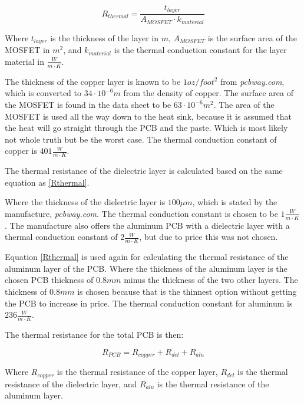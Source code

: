     \begin{equation}
        R_{thermal} = \frac{t_{layer}}{A_{MOSFET} \cdot k_{material}} 
        \label{Rthermal}
    \end{equation}
    
Where $t_{layer}$ is the thickness of the layer in $m$, $A_{MOSFET}$ is the surface area of the MOSFET in $m^2$, and $k_{material}$ is the thermal conduction constant for the layer material in $\frac{W}{m \cdot K}$.

The thickness of the copper layer is known to be $1 oz/foot^2$ from \textit{pcbway.com}, which is converted to $34 \cdot 10^{-6} m$ from the density of copper. The surface area of the MOSFET is found in the data sheet to be $63 \cdot 10^{-6} m^2$.\cite{mosfet} The area of the MOSFET is used all the way down to the heat sink, because it is assumed that the heat will go straight through the PCB and the paste. 
Which is most likely not whole truth but be the worst case.
The thermal conduction constant of copper is $401 \frac{W}{m \cdot K}$.\cite{toolbox}

The thermal resistance of the dielectric layer is calculated based on the same equation as \ref{Rthermal}.

Where the thickness of the dielectric layer is $100 \mu m$, which is stated by the manufacture, \textit{pcbway.com}. The thermal conduction constant is chosen to be $1 \frac{W}{m \cdot K}$. The manufacture also offers the aluminum PCB with a dielectric layer with a thermal conduction constant of $2 \frac{W}{m \cdot K}$, but due to price this was not chosen.

Equation \ref{Rthermal} is used again for calculating the thermal resistance of the aluminum layer of the PCB.
Where the thickness of the aluminum layer is the chosen PCB thickness of $0.8 mm$ minus the thickness of the two other layers. The thickness of $0.8 mm$ is chosen because that is the thinnest option without getting the PCB to increase in price. The thermal conduction constant for aluminum is $236 \frac{W}{m \cdot K}$.\cite{toolbox}

The thermal resistance for the total PCB is then:

    \begin{equation}
        R_{PCB} = R_{copper} + R_{del} + R_{alu}
        \label{RPCB}
    \end{equation}

Where $R_{copper}$ is the thermal resistance of the copper layer, $R_{del}$ is the thermal resistance of the dielectric layer, and $R_{alu}$ is the thermal resistance of the aluminum layer.

